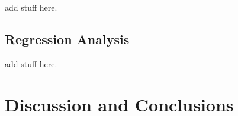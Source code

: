 \documentclass[
]{article}
\begin{document}
add stuff here.

\hypertarget{regression-analysis}{%
\subsection{\texorpdfstring{\textbf{Regression
Analysis}}{Regression Analysis}}\label{regression-analysis}}

add stuff here.

\hypertarget{discussion-and-conclusions}{%
\section{\texorpdfstring{\textbf{Discussion and
Conclusions}}{Discussion and Conclusions}}\label{discussion-and-conclusions}}
\end{document}
